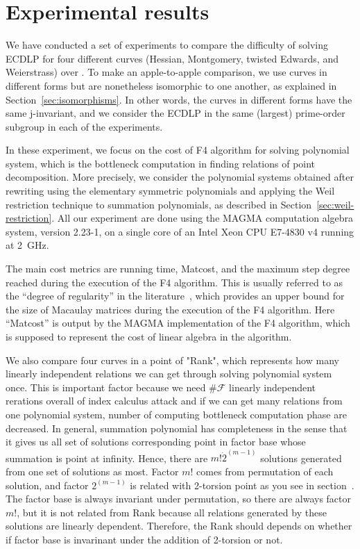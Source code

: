 \section{Experimental results}
\label{sec:experiment}

We have conducted a set of experiments to compare the difficulty of
solving ECDLP for four different curves (Hessian, Montgomery, twisted
Edwards, and Weierstrass) over .
%
To make an apple-to-apple comparison, we use curves in different forms
but are nonetheless isomorphic to one another, as explained in
Section~\ref{sec:isomorphisms}.
%
In other words, the curves in different forms have the same
j-invariant, and we consider the ECDLP in the same (largest)
prime-order subgroup in each of the experiments.

In these experiment, we focus on the cost of F4 algorithm for solving
polynomial system, which is the bottleneck computation in finding
relations of point decomposition.
%
More precisely, we consider the polynomial systems obtained after
rewriting using the elementary symmetric polynomials and applying the
Weil restriction technique to summation polynomials, as described in
Section~\ref{sec:weil-restriction}.
%
All our experiment are done using the MAGMA computation algebra
system, version 2.23-1, on a single core of an Intel Xeon CPU E7-4830
v4 running at 2~GHz.

The main cost metrics are running time, Matcost, and the maximum step
degree reached during the execution of the F4 algorithm.
%
This is usually referred to as the ``degree of regularity'' in the
literature~\cite{DBLP:conf/indocrypt/GalbraithG14}, which provides an
upper bound for the size of Macaulay matrices during the execution of
the F4 algorithm.
%
Here ``Matcost'' is output by the MAGMA implementation of the F4
algorithm, which is supposed to represent the cost of linear algebra
in the algorithm.

We also compare four curves in a point of "Rank", 
which represents how many linearly independent relations we can get 
through solving polynomial system once.
%
This is important factor because we need $\#\mathcal F$ linearly
independent rerations overall of index calculus attack
and if we can get many relations from one polynomial system, 
number of computing bottleneck computation phase are decreased.
%
In general, summation polynomial has completeness in the sense that
it gives us all set of solutions corresponding point in factor base
whose summation is point at infinity.
%
Hence, there are $m!\dot2^(m-1)$ solutions generated from 
one set of solutions as most. 
%
Factor $m!$ comes from permutation of each solution, and
factor $2^(m-1)$ is related with 2-torsion point as you see 
in section~\cite{sec:exploit-symmetry}.
%
The factor base is always invariant under permutation,
so there are always factor $m!$, but it is not related from Rank
because all relations generated by 
these solutions are linearly dependent.
%
Therefore, the Rank should depends on whether if factor base is 
invarinant under the addition of 2-torsion or not.


